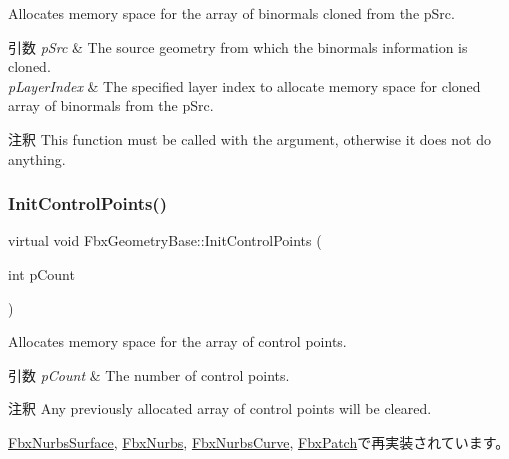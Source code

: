 Allocates memory space for the array of binormals cloned from the p\+Src. 
\begin{DoxyParams}{引数}
{\em p\+Src} & The source geometry from which the binormals information is cloned. \\
\hline
{\em p\+Layer\+Index} & The specified layer index to allocate memory space for cloned array of binormals from the p\+Src. \\
\hline
\end{DoxyParams}
\begin{DoxyRemark}{注釈}
This function must be called with the argument, otherwise it does not do anything. 
\end{DoxyRemark}
\mbox{\label{class_fbx_geometry_base_a471b736f2595c006a338c07a61907127}} 
\subsubsection{\texorpdfstring{Init\+Control\+Points()}{InitControlPoints()}}
{\footnotesize\ttfamily virtual void Fbx\+Geometry\+Base\+::\+Init\+Control\+Points (\begin{DoxyParamCaption}\item[{int}]{p\+Count }\end{DoxyParamCaption})\hspace{0.3cm}{\ttfamily [virtual]}}

Allocates memory space for the array of control points. 
\begin{DoxyParams}{引数}
{\em p\+Count} & The number of control points. \\
\hline
\end{DoxyParams}
\begin{DoxyRemark}{注釈}
Any previously allocated array of control points will be cleared. 
\end{DoxyRemark}


\hyperlink{class_fbx_nurbs_surface_ab4ba96b12b96a6adc0f95f345e3f3abd}{Fbx\+Nurbs\+Surface}, \hyperlink{class_fbx_nurbs_aa0ff0dd79f86ab4d6976b73d003fd6be}{Fbx\+Nurbs}, \hyperlink{class_fbx_nurbs_curve_ae6a6921bd7bbe88bcda86f14e9639df0}{Fbx\+Nurbs\+Curve}, \hyperlink{class_fbx_patch_a0f82daebd6307d417561b1d0a188f95d}{Fbx\+Patch}で再実装されています。

\mbox{\label{class_fbx_geometry_base_a4bab80d4a05c813ad635127612f43515}} 
